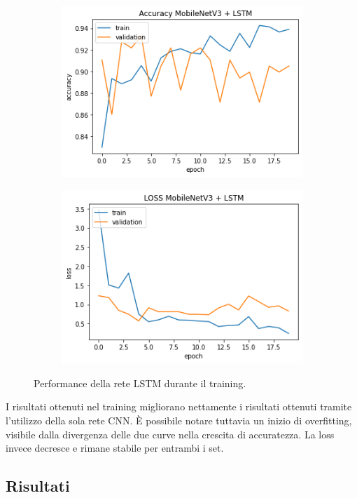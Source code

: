 \documentclass[11pt]{report}
\begin{document}
\begin{figure}[h]
\centering
	\begin{subfigure}[t]{.45\textwidth}
	\centering
    \includegraphics[scale = 0.5]{img/LSTM-accuracy.png}
	\end{subfigure}
	\quad
	\begin{subfigure}[t]{.45\textwidth}
	\centering
    \includegraphics[scale = 0.5]{img/LSTM-Loss.png}
	\end{subfigure}
	\quad
\caption{Performance della rete LSTM durante il training.}
\label{fig:train-LSTM}
\end{figure}


    I risultati ottenuti nel training migliorano nettamente i risultati ottenuti tramite l'utilizzo della sola rete CNN. È possibile notare tuttavia un inizio di overfitting, visibile dalla divergenza delle due curve nella crescita di accuratezza. La loss invece decresce e rimane stabile per entrambi i set.

\newpage

\subsection{Risultati}
\end{document}
